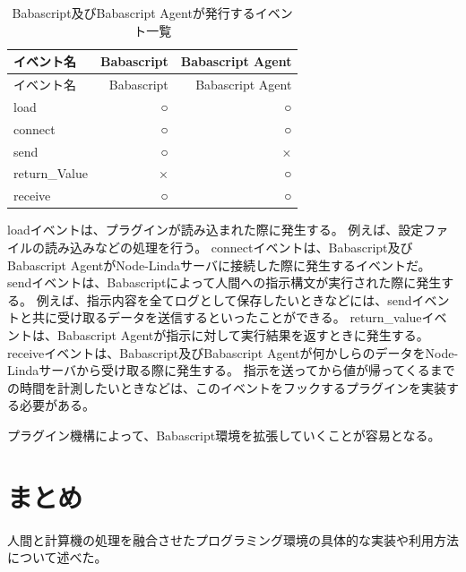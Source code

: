 \begin{longtable}[c]{@{}lrr@{}}
\caption{Babascript及びBabascript Agentが発行するイベント一覧
\label{table:plugin-events}}\tabularnewline
\toprule
イベント名 & Babascript & Babascript Agent\tabularnewline
\midrule
\endfirsthead
\toprule
イベント名 & Babascript & Babascript Agent\tabularnewline
\midrule
\endhead
load & ○ & ○\tabularnewline
connect & ○ & ○\tabularnewline
send & ○ & ×\tabularnewline
return\_Value & × & ○\tabularnewline
receive & ○ & ○\tabularnewline
\bottomrule
\end{longtable}

loadイベントは、プラグインが読み込まれた際に発生する。
例えば、設定ファイルの読み込みなどの処理を行う。
connectイベントは、Babascript及びBabascript
AgentがNode-Lindaサーバに接続した際に発生するイベントだ。
sendイベントは、Babascriptによって人間への指示構文が実行された際に発生する。
例えば、指示内容を全てログとして保存したいときなどには、sendイベントと共に受け取るデータを送信するといったことができる。
return\_valueイベントは、Babascript
Agentが指示に対して実行結果を返すときに発生する。
receiveイベントは、Babascript及びBabascript
Agentが何かしらのデータをNode-Lindaサーバから受け取る際に発生する。
指示を送ってから値が帰ってくるまでの時間を計測したいときなどは、このイベントをフックするプラグインを実装する必要がある。

プラグイン機構によって、Babascript環境を拡張していくことが容易となる。

\section{まとめ}\label{ux307eux3068ux3081}

人間と計算機の処理を融合させたプログラミング環境の具体的な実装や利用方法について述べた。
